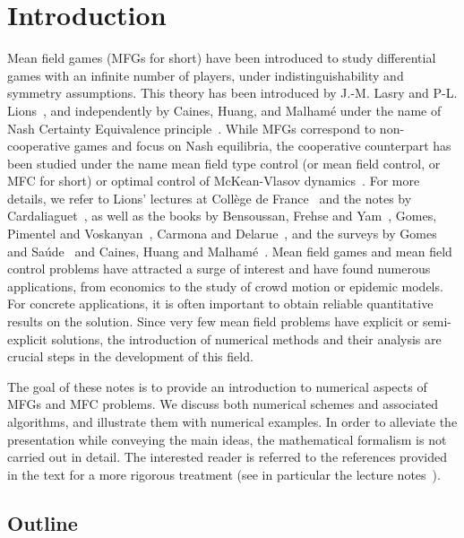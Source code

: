 \documentclass{amsproc}
\theoremstyle{definition}
\theoremstyle{remark}
\numberwithin{equation}{section}
\begin{document}
\section{\bf Introduction}



Mean field games (MFGs for short) have been introduced to study differential
games with an infinite number of players, under indistinguishability and symmetry assumptions. This theory has been introduced by J.-M. Lasry and P-L. Lions~\cite{MR2269875,MR2271747,MR2295621}, and independently by Caines, Huang, and Malham{\'e} under the name of Nash Certainty Equivalence principle~\cite{MR2346927,MR2352434}. While MFGs correspond to non-cooperative games and focus on Nash equilibria, the cooperative counterpart has been studied under the name mean field type control (or mean field control, or MFC for short) or optimal control of McKean-Vlasov dynamics~\cite{MR3395471,MR3134900}. For more details, we refer to Lions' lectures at Coll\`ege de France~\cite{PLL-CDF} and the notes by Cardaliaguet~\cite{Cardaliaguet-2013-notes}, as well as the books by Bensoussan, Frehse and Yam~\cite{MR3134900}, Gomes, Pimentel and Voskanyan~\cite{MR3559742}, Carmona and Delarue~\cite{MR3752669,MR3753660}, and the surveys by Gomes and Sa{\'u}de~\cite{MR3195844} and Caines, Huang and Malham{\'e}~\cite{CHM-2017-survey}. Mean field games and mean field control problems have attracted a surge of interest and have found numerous applications, from economics to the study of crowd motion or epidemic models. 
For concrete applications, it is often important to obtain reliable quantitative results on the solution. Since very few mean field problems have explicit or semi-explicit solutions, the introduction of numerical methods and their analysis are crucial steps in the development of this field. 

The goal of these notes is to provide an introduction to numerical aspects of MFGs and MFC problems. We discuss both numerical schemes and associated algorithms, and illustrate them with numerical examples. In order to alleviate the presentation while  conveying the main ideas, the mathematical formalism is not carried out in detail. The interested reader is referred to the references provided in the text for a more rigorous treatment (see in particular the lecture notes~\cite{MR3135339,achdoulauriere-2020-mfg-numerical}). 





\subsection{Outline}
\end{document}
